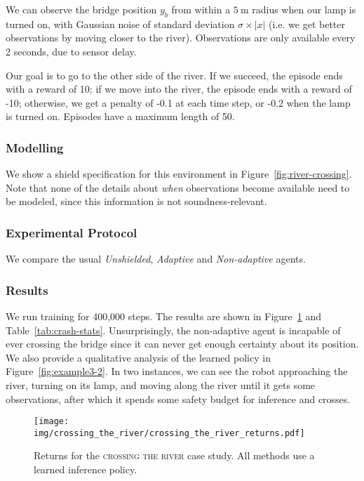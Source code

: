 We can observe the bridge position $y_b$ from within a $\qty{5}{\meter}$ radius when our lamp is turned on, with Gaussian noise of standard deviation $\sigma \times |x|$ (i.e. we get better observations by moving closer to the river). Observations are only available every 2 seconds, due to sensor delay.

Our goal is to go to the other side of the river. If we succeed, the episode ends with a reward of 10; if we move into the river, the episode ends with a reward of -10; otherwise, we get a penalty of -0.1 at each time step, or -0.2 when the lamp is turned on. Episodes have a maximum length of 50.

\subsubsection{Modelling} We show a shield specification for this environment in Figure~\ref{fig:river-crossing}. Note that none of the details about \emph{when} observations become available need to be modeled, since this information is not soundness-relevant.


\subsubsection{Experimental Protocol} We compare the usual \emph{Unshielded}, \emph{Adaptive} and \emph{Non-adaptive} agents.

\subsubsection{Results} We run training for 400,000 steps. The results are shown in Figure~\ref{fig:example3-1} and Table~\ref{tab:crash-stats}. Unsurprisingly, the non-adaptive agent is incapable of ever crossing the bridge since it can never get enough certainty about its position. We also provide a qualitative analysis of the learned policy in Figure~\ref{fig:example3-2}. In two instances, we can see the robot approaching the river, turning on its lamp, and moving along the river until it gets some observations, after which it spends some safety budget for inference and crosses.




\begin{figure}
    \texttt{[image: img/crossing\_the\_river/crossing\_the\_river\_returns.pdf]}
    \caption{Returns for the \textsc{crossing the river} case study. All methods use a learned inference policy.}
    \label{fig:example3-1}
    \Description[]{}
\end{figure}

